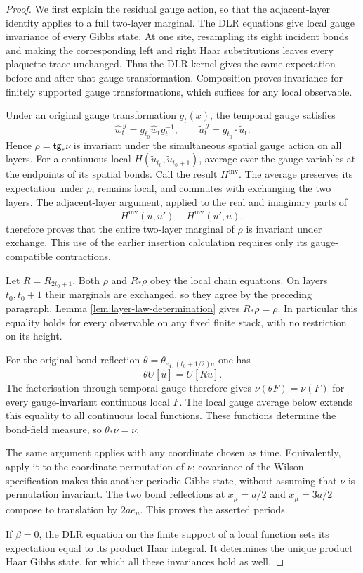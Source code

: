 \documentclass[11pt,letterpaper,reqno]{amsart}
\theoremstyle{definition}
\theoremstyle{remark}
\begin{document}
\begin{proof}
We first explain the residual gauge action, so that the adjacent-layer
identity applies to a full two-layer marginal. The DLR equations
give local gauge invariance of every Gibbs state. At one site,
resampling its eight incident bonds and making the corresponding
left and right Haar substitutions leaves every plaquette trace
unchanged. Thus the DLR kernel gives the same expectation before and
after that gauge transformation. Composition proves invariance for
finitely supported gauge transformations, which suffices for any
local observable.

Under an original gauge transformation $g_t(x)$, the temporal gauge
satisfies
\[
 \widehat w_t^{\,g}=g_{t_0}\widehat w_tg_t^{-1},\qquad
 \widetilde u_t^{\,g}=g_{t_0}\cdot\widetilde u_t.
\]
Hence $\rho=\mathsf{tg}_*\nu$ is invariant under the simultaneous
spatial gauge action on all layers. For a continuous local
$H(\widetilde u_{t_0},\widetilde u_{t_0+1})$, average over the gauge
variables at the endpoints of its spatial bonds. Call the result
$H^{\mathrm{inv}}$. The average preserves its expectation under
$\rho$, remains local, and commutes with exchanging the two layers.
The adjacent-layer argument, applied to the real and imaginary
parts of
\[
 H^{\mathrm{inv}}(u,u')-H^{\mathrm{inv}}(u',u),
\]
therefore proves that the entire two-layer marginal of $\rho$ is
invariant under exchange. This use of the earlier insertion
calculation requires only its gauge-compatible contractions.

Let $R=R_{2t_0+1}$. Both $\rho$ and $R_*\rho$ obey the local chain
equations. On layers $t_0,t_0+1$ their marginals are exchanged, so
they agree by the preceding paragraph. Lemma
\ref{lem:layer-law-determination} gives $R_*\rho=\rho$. In
particular this equality holds for every observable on any fixed
finite stack, with no restriction on its height.

For the original bond reflection
$\theta=\theta_{e_4,(t_0+1/2)a}$ one has
\[
 \theta U[\widetilde u]=U[R\widetilde u].
\]
The factorisation through temporal gauge therefore gives
$\nu(\theta F)=\nu(F)$ for every gauge-invariant continuous local
$F$. The local gauge average below
extends this equality to all continuous local functions. These
functions determine the bond-field measure, so $\theta_*\nu=\nu$.

The same argument applies with any coordinate chosen as time.
Equivalently, apply it to the coordinate permutation of $\nu$;
covariance of the Wilson specification makes this another periodic
Gibbs state, without assuming that $\nu$ is permutation invariant.
The two bond reflections at $x_\mu=a/2$ and $x_\mu=3a/2$ compose to
translation by $2ae_\mu$. This proves the asserted periods.

If $\beta=0$, the DLR equation on the finite support of a local
function sets its expectation equal to its product Haar integral.
It determines the unique product Haar Gibbs state, for which all
these invariances hold as well.
\end{proof}
\end{document}
